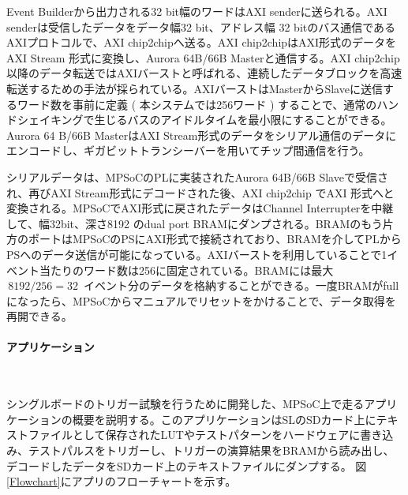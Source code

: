 Event Builderから出力される32 bit幅のワードはAXI senderに送られる。AXI senderは受信したデータをデータ幅32 bit、アドレス幅 32 bitのバス通信であるAXIプロトコルで、AXI chip2chipへ送る。AXI chip2chipはAXI形式のデータをAXI Stream 形式に変換し、Aurora 64B/66B Masterと通信する。AXI chip2chip以降のデータ転送ではAXIバーストと呼ばれる、連続したデータブロックを高速転送するための手法が採られている。AXIバーストはMasterからSlaveに送信するワード数を事前に定義 ( 本システムでは256ワード ) することで、通常のハンドシェイキングで生じるバスのアイドルタイムを最小限にすることができる。
Aurora 64 B/66B MasterはAXI Stream形式のデータをシリアル通信のデータにエンコードし、ギガビットトランシーバーを用いてチップ間通信を行う。

シリアルデータは、MPSoCのPLに実装されたAurora 64B/66B Slaveで受信され、再びAXI Stream形式にデコードされた後、AXI chip2chip でAXI 形式へと変換される。MPSoCでAXI形式に戻されたデータはChannel Interrupterを中継して、幅32bit、深さ8192 のdual port BRAMにダンプされる。BRAMのもう片方のポートはMPSoCのPSにAXI形式で接続されており、BRAMを介してPLからPSへのデータ送信が可能になっている。AXIバーストを利用していることで1イベント当たりのワード数は256に固定されている。BRAMには最大$ \,8192 / 256 = 32\,$ イベント分のデータを格納することができる。一度BRAMがfullになったら、MPSoCからマニュアルでリセットをかけることで、データ取得を再開できる。

\paragraph{アプリケーション}　　
\par
シングルボードのトリガー試験を行うために開発した、MPSoC上で走るアプリケーションの概要を説明する。このアプリケーションはSLのSDカード上にテキストファイルとして保存されたLUTやテストパターンをハードウェアに書き込み、テストパルスをトリガーし、トリガーの演算結果をBRAMから読み出し、デコードしたデータをSDカード上のテキストファイルにダンプする。
図\ref{Flowchart}にアプリのフローチャートを示す。

